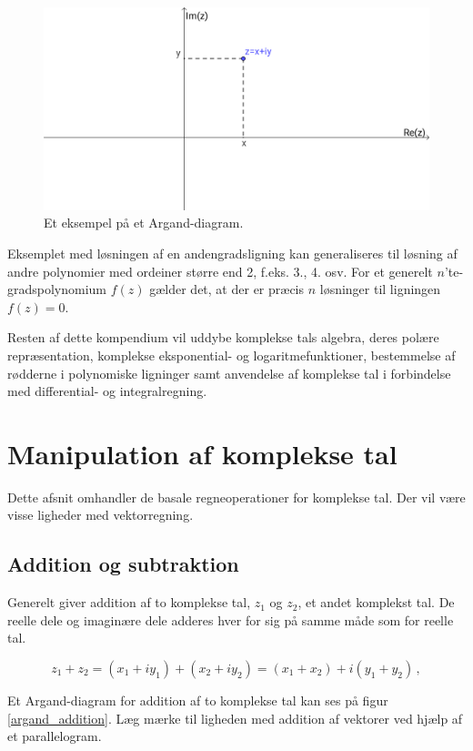 \documentclass[a4paper, 12pt,titlepage]{article}
\begin{document}
\begin{figure}[htbp]
\centering
\includegraphics[width=.9\linewidth]{./img/argand.png}
\caption{\label{argand}Et eksempel på et Argand-diagram.}
\end{figure}

Eksemplet med løsningen af en andengradsligning kan generaliseres til løsning af andre polynomier med ordeiner større end 2, f.eks. 3., 4. osv. For et generelt \(n\)​'te-gradspolynomium \(f(z)\) gælder det, at der er præcis \(n\) løsninger til ligningen \(f(z)=0\).

Resten af dette kompendium vil uddybe komplekse tals algebra, deres polære repræsentation, komplekse eksponential- og logaritmefunktioner, bestemmelse af rødderne i polynomiske ligninger samt anvendelse af komplekse tal i forbindelse med differential- og integralregning.

\section{Manipulation af komplekse tal}
\label{sec:orgc97a2a8}

Dette afsnit omhandler de basale regneoperationer for komplekse tal. Der vil være visse ligheder med vektorregning.

\subsection{Addition og subtraktion}
\label{sec:orgdbd083b}

Generelt giver addition af to komplekse tal, \(z_1\) og \(z_2\), et andet komplekst tal. De reelle dele og imaginære dele adderes hver for sig på samme måde som for reelle tal.

$$z_1 + z_2 = (x_1 + i y_1) + (x_2 + i y_2) = (x_1 + x_2) + i ( y_1 + y_2) \, ,$$

Et Argand-diagram for addition af to komplekse tal kan ses på figur \ref{argand_addition}. Læg mærke til ligheden med addition af vektorer ved hjælp af et parallelogram.
\end{document}
